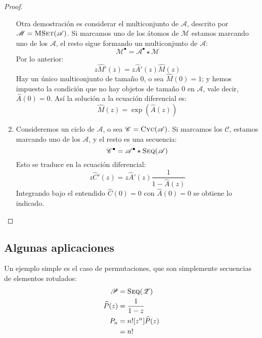 \begin{proof}
\begin{enumerate}
      Otra demostración es considerar el multiconjunto de \(\mathscr{A}\),
      descrito por \(\mathscr{M} = \operatorname{\textsc{MSet}}(\mathscr{A})\).
      Si marcamos uno de los átomos de \(\mathscr{M}\)
      estamos marcando uno de los \(\mathscr{A}\),
      el resto sigue formando un multiconjunto de \(\mathscr{A}\):
      \begin{equation*}
        \mathscr{M}^\bullet
          = \mathscr{A}^\bullet \star \mathscr{M}
      \end{equation*}
      Por lo anterior:
      \begin{equation*}
        z \widehat{M}'(z)
          = z \widehat{A}'(z) \widehat{M}(z)
      \end{equation*}
      Hay un único multiconjunto de tamaño \num{0},
      o sea \(\widehat{M}(0) = 1\);
      y hemos impuesto la condición
      que no hay objetos de tamaño \num{0} en \(\mathscr{A}\),
      vale decir,
      \(\widehat{A}(0) = 0\).
      Así la solución a la ecuación diferencial es:
      \begin{equation*}
        \widehat{M}(z)
          = \exp(\widehat{A}(z))
      \end{equation*}
    \item %
      Consideremos un ciclo de \(\mathscr{A}\),
      o sea \(\mathscr{C} = \operatorname{\textsc{Cyc}}(\mathscr{A})\).
      Si marcamos los \(\mathscr{C}\),
      estamos marcando uno de los \(\mathscr{A}\),
      y el resto es una secuencia:
      \begin{equation*}
        \mathscr{C}^\bullet
          = \mathscr{A}^\bullet \star \operatorname{\textsc{Seq}}(\mathscr{A})
      \end{equation*}
      Esto se traduce en la ecuación diferencial:
      \begin{equation*}
        z \widehat{C}'(z)
          = z \widehat{A}'(z) \frac{1}{1 - \widehat{A}(z)}
      \end{equation*}
      Integrando bajo el entendido \(\widehat{C}(0) = 0\)
      con \(\widehat{A}(0) = 0\)
      se obtiene lo indicado.
    \end{enumerate}
  \end{proof}

\subsection{Algunas aplicaciones}
\label{sec:ms-egf-aplicaciones}

  Un ejemplo simple es el caso de permutaciones,
  que son simplemente secuencias de elementos rotulados:
  \begin{align*}
    \mathscr{P}
      &= \operatorname{\textsc{Seq}}(\mathscr{Z}) \\
    \widehat{P}(z)
      &= \frac{1}{1 - z} \\
    P_n
      &= n! [z^n] \widehat{P}(z) \\
      &= n!
  \end{align*}

